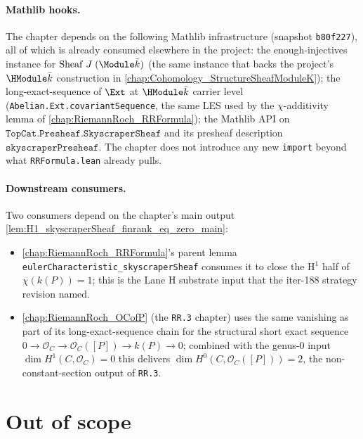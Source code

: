 \paragraph{Mathlib hooks.} The chapter depends on the following Mathlib
infrastructure (snapshot \texttt{b80f227}), all of which is already
consumed elsewhere in the project: the enough-injectives instance for
\(\mathrm{Sheaf}\;J\;(\Module \bar k)\) (the same instance that backs
the project's \(\HModule \bar k\) construction in
\cref{chap:Cohomology_StructureSheafModuleK}); the long-exact-sequence
of \(\Ext\) at \(\HModule \bar k\) carrier level
(\texttt{Abelian.Ext.covariantSequence}, the same LES used by the
\(\chi\)-additivity lemma of
\cref{chap:RiemannRoch_RRFormula}); the Mathlib API on
\(\mathtt{TopCat.Presheaf.SkyscraperSheaf}\) and its presheaf
description \(\mathtt{skyscraperPresheaf}\). The chapter does not
introduce any new \texttt{import} beyond what
\texttt{RRFormula.lean} already pulls.

\paragraph{Downstream consumers.} Two consumers depend on the chapter's
main output \cref{lem:H1_skyscraperSheaf_finrank_eq_zero_main}:
\begin{itemize}
  \item \cref{chap:RiemannRoch_RRFormula}'s parent lemma
    \texttt{eulerCharacteristic\_skyscraperSheaf} consumes it to close
    the H\(^1\) half of \(\chi(k(P)) = 1\); this is the Lane H
    substrate input that the iter-188 strategy revision named.
  \item \cref{chap:RiemannRoch_OCofP} (the \texttt{RR.3} chapter) uses
    the same vanishing as part of its long-exact-sequence chain for the
    structural short exact sequence
    \(0 \to \mathcal O_C \to \mathcal O_C([P]) \to k(P) \to 0\);
    combined with the genus-\(0\) input
    \(\dim H^1(C, \mathcal O_C) = 0\) this delivers
    \(\dim H^0(C, \mathcal O_C([P])) = 2\), the non-constant-section
    output of \texttt{RR.3}.
\end{itemize}

\section{Out of scope}

